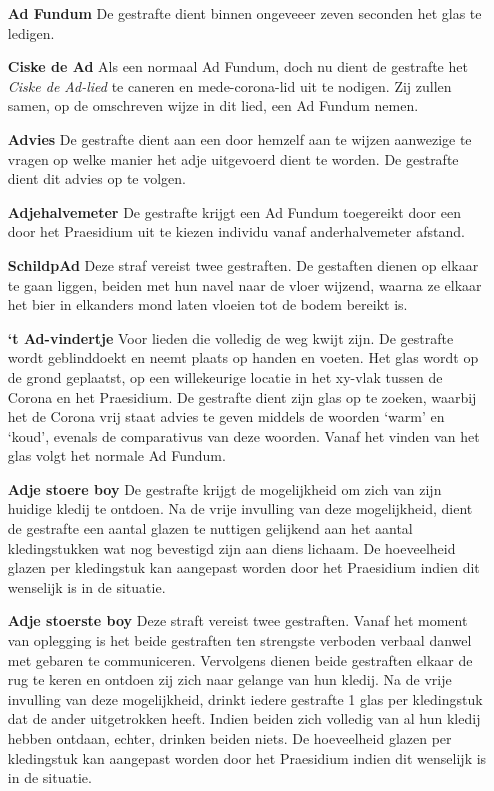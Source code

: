 \begin{itemize}
    \item[\textbf{Ad Fundum}] De gestrafte dient binnen ongeveeer zeven seconden het glas te ledigen.
    
    \item[\textbf{Ciske de Ad}] Als een normaal Ad Fundum, doch nu dient de gestrafte het \textit{Ciske de Ad-lied} te caneren en mede-corona-lid uit te nodigen. Zij zullen samen, op de omschreven wijze in dit lied, een Ad Fundum nemen.
    
    \item[\textbf{Advies}] De gestrafte dient aan een door hemzelf aan te wijzen aanwezige te vragen op welke manier het adje uitgevoerd dient te worden. De gestrafte dient dit advies op te volgen.

    \item[\textbf{Adjehalvemeter}] De gestrafte krijgt een Ad Fundum toegereikt door een door het Praesidium uit te kiezen individu vanaf anderhalvemeter afstand.
    
    \item[\textbf{SchildpAd}] Deze straf vereist twee gestraften. De gestaften dienen op elkaar te gaan liggen, beiden met hun navel naar de vloer wijzend, waarna ze elkaar het bier in elkanders mond laten vloeien tot de bodem bereikt is.
    
    \item[\textbf{‘t Ad-vindertje}] Voor lieden die volledig de weg kwijt zijn. De gestrafte wordt geblinddoekt en neemt plaats op handen en voeten. Het glas wordt op de grond geplaatst, op een willekeurige locatie in het xy-vlak tussen de Corona en het Praesidium. De gestrafte dient zijn glas op te zoeken, waarbij het de Corona vrij staat advies te geven middels de woorden ‘warm’ en ‘koud’, evenals de comparativus van deze woorden. Vanaf het vinden van het glas volgt het normale Ad Fundum.
    
    \item[\textbf{Adje stoere boy}] De gestrafte krijgt de mogelijkheid om zich van zijn huidige kledij te ontdoen. Na de vrije invulling van deze mogelijkheid, dient de gestrafte een aantal glazen te nuttigen gelijkend aan het aantal kledingstukken wat nog bevestigd zijn aan diens lichaam. De hoeveelheid glazen per kledingstuk kan aangepast worden door het Praesidium indien dit wenselijk is in de situatie. 
    
    \item[\textbf{Adje stoerste boy}] Deze straft vereist twee gestraften. Vanaf het moment van oplegging is het beide gestraften ten strengste verboden verbaal danwel met gebaren te communiceren. Vervolgens dienen beide gestraften elkaar de rug te keren en ontdoen zij zich naar gelange van hun kledij. Na de vrije invulling van deze mogelijkheid, drinkt iedere gestrafte 1 glas per kledingstuk dat de ander uitgetrokken heeft. Indien beiden zich volledig van al hun kledij hebben ontdaan, echter, drinken beiden niets. De hoeveelheid glazen per kledingstuk kan aangepast worden door het Praesidium indien dit wenselijk is in de situatie. 


\end{itemize}
